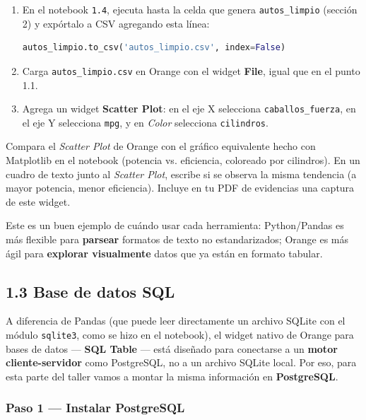 \documentclass[11pt,letterpaper]{article}
\begin{document}
\begin{enumerate}[leftmargin=1.2cm]
  \item En el notebook \texttt{1.4}, ejecuta hasta la celda que genera \texttt{autos\_limpio} (sección 2) y expórtalo a CSV agregando esta línea:
  \begin{lstlisting}[language=Python]
autos_limpio.to_csv('autos_limpio.csv', index=False)
  \end{lstlisting}
  \item Carga \texttt{autos\_limpio.csv} en Orange con el widget \textbf{File}, igual que en el punto 1.1.
  \item Agrega un widget \textbf{Scatter Plot}: en el eje X selecciona \texttt{caballos\_fuerza}, en el eje Y selecciona \texttt{mpg}, y en \textit{Color} selecciona \texttt{cilindros}.
\end{enumerate}

\begin{actividad}
Compara el \textit{Scatter Plot} de Orange con el gráfico equivalente hecho con Matplotlib en el notebook (potencia vs. eficiencia, coloreado por cilindros). En un cuadro de texto junto al \textit{Scatter Plot}, escribe si se observa la misma tendencia (a mayor potencia, menor eficiencia). Incluye en tu PDF de evidencias una captura de este widget.
\end{actividad}

\begin{nota}
Este es un buen ejemplo de cuándo usar cada herramienta: Python/Pandas es más flexible para \textbf{parsear} formatos de texto no estandarizados; Orange es más ágil para \textbf{explorar visualmente} datos que ya están en formato tabular.
\end{nota}

\subsection{1.3 Base de datos SQL}

A diferencia de Pandas (que puede leer directamente un archivo SQLite con el módulo \texttt{sqlite3}, como se hizo en el notebook), el widget nativo de Orange para bases de datos --- \textbf{SQL Table} --- está diseñado para conectarse a un \textbf{motor cliente-servidor} como PostgreSQL, no a un archivo SQLite local. Por eso, para esta parte del taller vamos a montar la misma información en \textbf{PostgreSQL}.

\subsubsection*{Paso 1 --- Instalar PostgreSQL}
\end{document}
